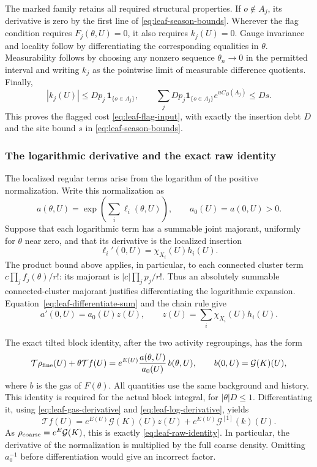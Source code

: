 The marked family retains all required structural properties.
If $o\notin A_j$, its derivative is zero by the first line of
\eqref{eq:leaf-season-bounds}. Wherever the flag condition requires
$F_j(\theta,U)=0$, it also requires $k_j(U)=0$. Gauge invariance and
locality follow by differentiating the corresponding equalities in
$\theta$. Measurability follows by choosing any nonzero sequence
$\theta_n\to0$ in the permitted interval and writing $k_j$ as the
pointwise limit of measurable difference quotients. Finally,
\[
 |k_j(U)|\le Dp_j\,\mathbf1_{\{o\in A_j\}},\qquad
 \sum_j Dp_j\mathbf1_{\{o\in A_j\}}e^{uC_B(A_j)}\le Ds.
\]
This proves the flagged cost \eqref{eq:leaf-flag-input}, with exactly
the insertion debt $D$ and the site bound $s$ in
\eqref{eq:leaf-season-bounds}.

\subsubsection{The logarithmic derivative and the exact raw identity}
The localized regular terms arise from the logarithm of the positive
normalization. Write this normalization as
\[
 a(\theta,U)=\exp\left(\sum_i\ell_i(\theta,U)\right),
                 \qquad a_0(U)=a(0,U)>0.
\]
Suppose that each logarithmic term has a summable joint majorant,
uniformly for $\theta$ near zero, and that its derivative is the
localized insertion
\[
               \ell_i'(0,U)=\chi_{X_i}(U)h_i(U).
\]
The product bound above applies, in particular, to each connected
cluster term $c\prod_j f_j(\theta)/r!$: its majorant is
$|c|\prod_jp_j/r!$. Thus an absolutely summable connected-cluster
majorant justifies differentiating the logarithmic expansion.
Equation~\eqref{eq:leaf-differentiate-sum} and the chain rule give
\begin{equation}\label{eq:leaf-log-derivative}
      a'(0,U)=a_0(U)z(U),\qquad
                 z(U)=\sum_i\chi_{X_i}(U)h_i(U).
\end{equation}

The exact tilted block identity, after the two activity regroupings,
has the form
\begin{equation}\label{eq:leaf-tilted-identity}
 \mathcal T\rho_{\rm fine}(U)+\theta\mathcal T f(U)
       =e^{E(U)}\frac{a(\theta,U)}{a_0(U)}\,b(\theta,U),
 \qquad b(0,U)=\mathcal G(K)(U),
\end{equation}
where $b$ is the gas of $F(\theta)$. All quantities use the same
background and history. This identity is required for the actual block
integral, for $|\theta|D\le1$. Differentiating it, using
\eqref{eq:leaf-gas-derivative} and \eqref{eq:leaf-log-derivative}, yields
\[
 \mathcal T f(U)
 =e^{E(U)}\mathcal G(K)(U)z(U)
                      +e^{E(U)}\mathcal G^{[1]}(k)(U).
\]
As $\rho_{\rm coarse}=e^E\mathcal G(K)$, this is exactly
\eqref{eq:leaf-raw-identity}. In particular, the derivative of the
normalization is multiplied by the full coarse density. Omitting
$a_0^{-1}$ before differentiation would give an incorrect factor.

